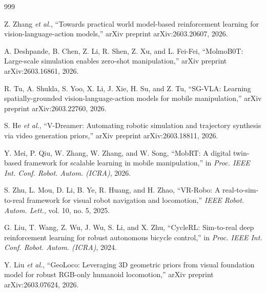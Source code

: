 \documentclass[12pt,a4paper,oneside]{report}
\begin{document}
\begin{thebibliography}{999}

Z. Zhang \textit{et al.}, ``Towards practical world model-based reinforcement learning for vision-language-action models,'' arXiv preprint arXiv:2603.20607, 2026.




A. Deshpande, B. Chen, Z. Li, R. Shen, Z. Xu, and L. Fei-Fei, ``{MolmoB0T}: Large-scale simulation enables zero-shot manipulation,'' arXiv preprint arXiv:2603.16861, 2026.




R. Tu, A. Shukla, S. Yoo, X. Li, J. Xie, H. Su, and Z. Tu, ``{SG-VLA}: Learning spatially-grounded vision-language-action models for mobile manipulation,'' arXiv preprint arXiv:2603.22760, 2026.




S. He \textit{et al.}, ``{V-Dreamer}: Automating robotic simulation and trajectory synthesis via video generation priors,'' arXiv preprint arXiv:2603.18811, 2026.




Y. Mei, P. Qiu, W. Zhang, W. Zhang, and W. Song, ``{MobRT}: A digital twin-based framework for scalable learning in mobile manipulation,'' in \textit{Proc. IEEE Int. Conf. Robot. Autom. (ICRA)}, 2026.




S. Zhu, L. Mou, D. Li, B. Ye, R. Huang, and H. Zhao, ``{VR-Robo}: A real-to-sim-to-real framework for visual robot navigation and locomotion,'' \textit{IEEE Robot. Autom. Lett.}, vol. 10, no. 5, 2025.




G. Liu, T. Wang, Z. Wu, J. Wu, S. Li, and X. Zhu, ``{CycleRL}: Sim-to-real deep reinforcement learning for robust autonomous bicycle control,'' in \textit{Proc. IEEE Int. Conf. Robot. Autom. (ICRA)}, 2024.




Y. Liu \textit{et al.}, ``{GeoLoco}: Leveraging 3D geometric priors from visual foundation model for robust {RGB}-only humanoid locomotion,'' arXiv preprint arXiv:2603.07624, 2026.




\end{thebibliography}
\end{document}
